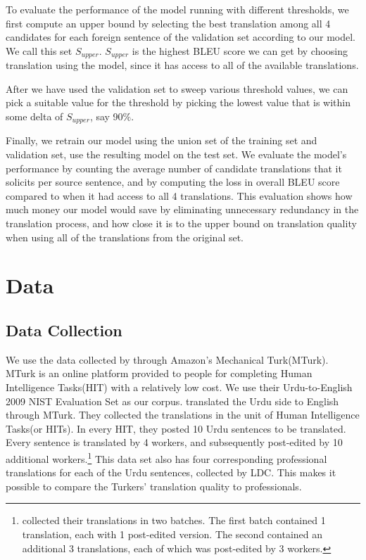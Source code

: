 \documentclass[11pt]{article}
\begin{document}
To evaluate the performance of the model running with different thresholds, we first compute an upper bound by selecting the best translation among all 4 candidates for each foreign sentence of the validation set according to our  model. We call this set $S_{upper}$.  $S_{upper}$ is the highest BLEU score we can get by choosing translation using the model, since it has access to all of the available translations.  

After we have used the validation set to sweep various threshold values,  we can pick a suitable value for the threshold by picking the lowest value that is within some delta of $S_{upper}$, say  90$\%$. 

Finally, we retrain our model using the union set of the training set and validation set, use the resulting model on the test set.  We evaluate the model's performance by counting the average number of candidate translations that it solicits per source sentence, and by computing the loss in overall BLEU score compared to when it had access to all 4 translations.  This evaluation shows how much money our model would save by eliminating unnecessary redundancy in the translation process, and how close it is to the upper bound on translation quality when using all of the translations from the original set.


\section{Data}
\subsection{Data Collection}

We use the data collected by   through Amazon's Mechanical Turk(MTurk). MTurk is an online platform provided to people for completing Human Intelligence Tasks(HIT) with a relatively low cost. We use their Urdu-to-English 2009 NIST Evaluation Set as our corpus.    translated the Urdu side to English through MTurk. They collected the translations in the unit of Human Intelligence Tasks(or HITs). In every HIT, they posted 10 Urdu sentences to be translated. Every sentence is translated by 4 workers, and subsequently post-edited by 10 additional workers.\footnote{  collected their translations in two batches.  The first batch contained 1 translation, each with 1 post-edited  version.  The second contained an additional 3 translations, each of which was post-edited by 3 workers.}
This data set also has four corresponding professional translations for each  of the Urdu sentences, collected by LDC. This makes it possible to compare the Turkers' translation quality to professionals. 
\end{document}
